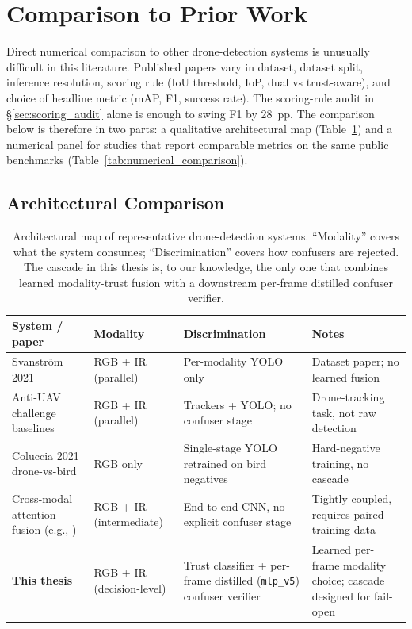 \documentclass[12pt,a4paper,oneside,openright]{book}
\begin{document}
\section{Comparison to Prior Work}
\label{sec:comparison}

Direct numerical comparison to other drone-detection systems is unusually difficult in this literature. Published papers vary in dataset, dataset split, inference resolution, scoring rule (IoU threshold, IoP, dual vs trust-aware), and choice of headline metric (mAP, F1, success rate). The scoring-rule audit in \S\ref{sec:scoring_audit} alone is enough to swing F1 by 28~pp. The comparison below is therefore in two parts: a qualitative architectural map (Table~\ref{tab:related_systems}) and a numerical panel for studies that report comparable metrics on the same public benchmarks (Table~\ref{tab:numerical_comparison}).

\subsection{Architectural Comparison}

\begin{table}[htbp]
    \centering
    \caption{Architectural map of representative drone-detection systems. ``Modality'' covers what the system consumes; ``Discrimination'' covers how confusers are rejected. The cascade in this thesis is, to our knowledge, the only one that combines learned modality-trust fusion with a downstream per-frame distilled confuser verifier.}
    \label{tab:related_systems}
    \begin{tabular}{p{4.0cm}lll}
        \toprule
        System / paper & Modality & Discrimination & Notes \\
        \midrule
        Svanstr\"om 2021~\cite{svanstrom2021real} & RGB + IR (parallel) & Per-modality YOLO only & Dataset paper; no learned fusion \\
        Anti-UAV challenge baselines~\cite{jiang2021antiuav} & RGB + IR (parallel) & Trackers + YOLO; no confuser stage & Drone-tracking task, not raw detection \\
        Coluccia 2021 drone-vs-bird~\cite{coluccia2021dronevsbird} & RGB only & Single-stage YOLO retrained on bird negatives & Hard-negative training, no cascade \\
        Cross-modal attention fusion (e.g., \cite{wagner2016multispectral}) & RGB + IR (intermediate) & End-to-end CNN, no explicit confuser stage & Tightly coupled, requires paired training data \\
        \textbf{This thesis} & RGB + IR (decision-level) & Trust classifier + per-frame distilled (\texttt{mlp\_v5}) confuser verifier & Learned per-frame modality choice; cascade designed for fail-open \\
        \bottomrule
    \end{tabular}
\end{table}
\end{document}
